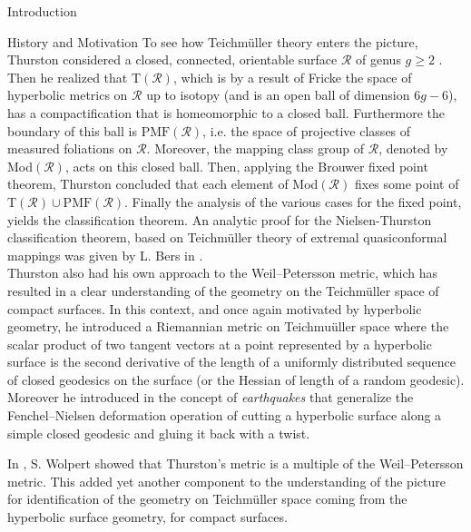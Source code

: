 \documentclass[12pt]{amsart}
\theoremstyle{plain}
\theoremstyle{definition}
\theoremstyle{remark}
\numberwithin{equation}{section} %
\numberwithin{figure}{section} %
\begin{document}
\begin{section}{Introduction}
\begin{subsection}{History and Motivation}
To see how Teichm\"uller theory enters the picture, Thurston considered a closed, connected, orientable surface \(\mathscr{R}\) of genus \(g \geq 2\) . Then he realized that 
T\(\left(\mathscr{R}\right)\), which is by a result of Fricke the space of hyperbolic metrics on \(\mathscr{R}\) up to isotopy (and
is an open ball of dimension \(6 g-6\)), has
a compactification that is homeomorphic to a closed ball. Furthermore the boundary of this ball is
\(\mathrm{PMF}(\mathscr{R})\), i.e. the space of projective classes of measured foliations on \(\mathscr{R}\). Moreover, the mapping class group of $\mathscr{R}$, denoted by
Mod\(\left(\mathscr{R}\right)\), acts on this closed ball. Then, applying the
Brouwer fixed point theorem, Thurston concluded that each element of Mod\(\left(\mathscr{R}\right)\)
fixes some point of T\(\left(\mathscr{R}\right) \cup \mathrm{PMF}(\mathscr{R})\). Finally the analysis of the various cases for the fixed point, yields the classification theorem. An analytic proof for the Nielsen-Thurston classification theorem, based on Teichm\"uller theory of extremal quasiconformal mappings was given by L. Bers in \cite{Bers1}. \\

Thurston also had his own 
approach to the Weil–Petersson metric, which has resulted in a clear understanding of the geometry on the Teichm\"uller space of compact surfaces. In this context, and once again motivated by hyperbolic geometry, he introduced a Riemannian metric on Teichmu\"uller space where
the scalar product of two tangent vectors at a point represented by a hyperbolic surface is the second derivative of the length of a uniformly distributed sequence of closed geodesics on the surface (or the Hessian of length of a random geodesic). Moreover he introduced in \cite{Thur1} the concept of {\it earthquakes} that generalize the Fenchel–Nielsen deformation operation of cutting a hyperbolic surface along a simple closed geodesic and gluing it back with a twist.

In \cite{WolpertThur}, S. Wolpert showed that Thurston’s metric is a multiple of the Weil–Petersson metric. This added yet another component to the understanding of  the picture for identification of
the geometry on Teichm\"uller space coming from the hyperbolic surface geometry, for compact surfaces.


\end{subsection}
\end{section}
\end{document}
